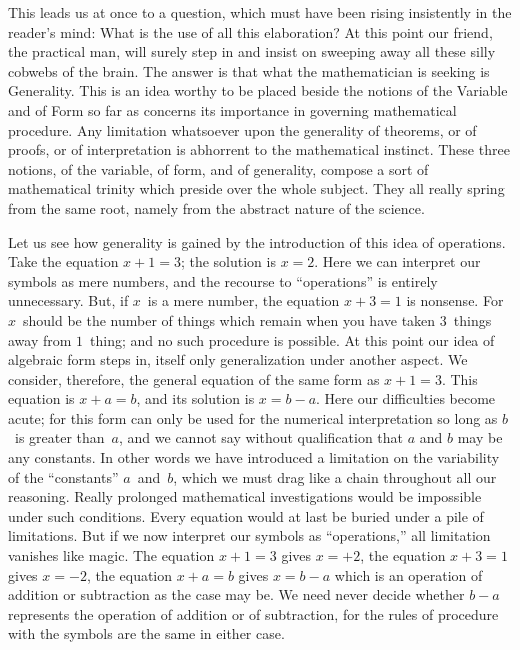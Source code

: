 \documentclass[12pt,leqno]{book}[2005/09/16]
\newcommand{\PageSep}[1]{\ignorespaces}
\begin{document}
This leads us at once to a question, which
must have been rising insistently in the
\PageSep{82}
reader's mind: What is the use of all this
elaboration? At this point our friend, the
practical man, will surely step in and insist on
sweeping away all these silly cobwebs of the
brain. The answer is that what the mathematician
is seeking is Generality. This is an
%
idea worthy to be placed beside the notions
of the Variable and of Form so far as concerns
%
%
its importance in governing mathematical
procedure. Any limitation whatsoever upon
the generality of theorems, or of proofs, or of
interpretation is abhorrent to the mathematical
instinct. These three notions, of the
variable, of form, and of generality, compose
a sort of mathematical trinity which preside
over the whole subject. They all really
spring from the same root, namely from the
abstract nature of the science.

Let us see how generality is gained by the
introduction of this idea of operations. Take
the equation $x + 1 = 3$; the solution is $x = 2$.
Here we can interpret our symbols as mere
numbers, and the recourse to ``operations''
is entirely unnecessary. But, if $x$~is a mere
number, the equation $x + 3 = 1$ is nonsense.
For $x$~should be the number of things which
remain when you have taken $3$~things away
from $1$~thing; and no such procedure is
possible. At this point our idea of algebraic
form steps in, itself only generalization under
another aspect. We consider, therefore, the
\PageSep{83}
%
general equation of the same form as $x + 1 = 3$.
This equation is $x + a = b$, and its solution is
$x = b - a$. Here our difficulties become acute;
for this form can only be used for the numerical
interpretation so long as $b$~is greater than~$a$,
and we cannot say without qualification
that $a$ and $b$ may be any constants. In other
words we have introduced a limitation on
the variability of the ``constants'' $a$~and~$b$,
which we must drag like a chain throughout
all our reasoning. Really prolonged mathematical
investigations would be impossible
under such conditions. Every equation
would at last be buried under a pile of limitations.
But if we now interpret our symbols
as ``operations,'' all limitation vanishes like
magic. The equation $x + 1 = 3$ gives $x = +2$,
the equation $x + 3 = 1$ gives $x = -2$, the equation
$x + a = b$ gives $x = b - a$ which is an operation
of addition or subtraction as the case
may be. We need never decide whether $b - a$
represents the operation of addition or of
subtraction, for the rules of procedure with
the symbols are the same in either case.
\end{document}

